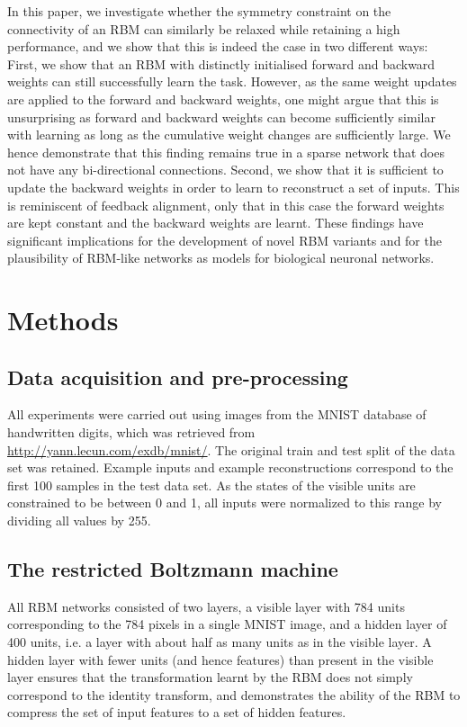 \documentclass[11pt]{article}
\begin{document}
In this paper, we investigate whether the symmetry constraint on the
connectivity of an RBM can similarly be relaxed while retaining a high
performance, and we show that this is indeed the case in two different
ways: %
First, we show that an RBM with distinctly initialised forward and
backward weights can still successfully learn the task. However, as
the same weight updates are applied to the forward and backward
weights, one might argue that this is unsurprising as forward and
backward weights can become sufficiently similar with learning as long
as the cumulative weight changes are sufficiently large. We hence
demonstrate that this finding remains true in a sparse network that
does not have any bi-directional connections. %
Second, we show that it is sufficient to update the backward weights
in order to learn to reconstruct a set of inputs. This is reminiscent
of feedback alignment, only that in this case the forward weights are
kept constant and the backward weights are learnt. %
These findings have significant implications for the development of
novel RBM variants and for the plausibility of RBM-like networks as
models for biological neuronal networks.

\section{Methods}

\subsection{Data acquisition and pre-processing}

All experiments were carried out using images from the MNIST database
of handwritten digits, which was retrieved from
\url{http://yann.lecun.com/exdb/mnist/}. The original train and test split
of the data set was retained. Example inputs and example
reconstructions correspond to the first 100 samples in the test data
set. As the states of the visible units are constrained to be between
0 and 1, all inputs were normalized to this range by dividing all
values by 255.

\subsection{The restricted Boltzmann machine}

All RBM networks consisted of two layers, a visible layer with 784
units corresponding to the 784 pixels in a single MNIST image, and a
hidden layer of 400 units, i.e. a layer with about half as many units
as in the visible layer. A hidden layer with fewer units (and hence
features) than present in the visible layer ensures that the
transformation learnt by the RBM does not simply correspond to the
identity transform, and demonstrates the ability of the RBM to
compress the set of input features to a set of hidden features.
\end{document}
